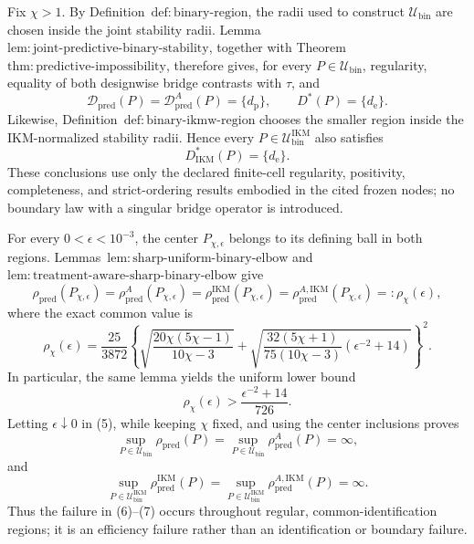 Fix \(\chi>1\). By Definition~\(\mathrm{def{:}binary\text{-}region}\), the radii used to construct \(\mathcal U_{\mathrm{bin}}\) are chosen inside the joint stability radii. Lemma~\(\mathrm{lem{:}joint\text{-}predictive\text{-}binary\text{-}stability}\), together with Theorem~\(\mathrm{thm{:}predictive\text{-}impossibility}\), therefore gives, for every \(P\in\mathcal U_{\mathrm{bin}}\), regularity, equality of both designwise bridge contrasts with \(\tau\), and
\[
 \mathcal D_{\mathrm{pred}}(P)
 =\mathcal D_{\mathrm{pred}}^A(P)=\{d_{\mathrm p}\},
 \qquad
 D^*(P)=\{d_{\mathrm e}\}. \tag{1}
\]
Likewise, Definition~\(\mathrm{def{:}binary\text{-}ikmw\text{-}region}\) chooses the smaller region inside the IKM-normalized stability radii. Hence every \(P\in\mathcal U_{\mathrm{bin}}^{\mathrm{IKM}}\) also satisfies
\[
 D_{\mathrm{IKM}}^*(P)=\{d_{\mathrm e}\}. \tag{2}
\]
These conclusions use only the declared finite-cell regularity, positivity, completeness, and strict-ordering results embodied in the cited frozen nodes; no boundary law with a singular bridge operator is introduced.

For every \(0<\epsilon<10^{-3}\), the center \(P_{\chi,\epsilon}\) belongs to its defining ball in both regions. Lemmas~\(\mathrm{lem{:}sharp\text{-}uniform\text{-}binary\text{-}elbow}\) and \(\mathrm{lem{:}treatment\text{-}aware\text{-}sharp\text{-}binary\text{-}elbow}\) give
\[
 \rho_{\mathrm{pred}}(P_{\chi,\epsilon})
 =\rho_{\mathrm{pred}}^A(P_{\chi,\epsilon})
 =\rho_{\mathrm{pred}}^{\mathrm{IKM}}(P_{\chi,\epsilon})
 =\rho_{\mathrm{pred}}^{A,\mathrm{IKM}}(P_{\chi,\epsilon})
 =:\rho_\chi(\epsilon), \tag{3}
\]
where the exact common value is
\[
 \rho_\chi(\epsilon)
 =\frac{25}{3872}
 \left\{
 \sqrt{\frac{20\chi(5\chi-1)}{10\chi-3}}
 +\sqrt{\frac{32(5\chi+1)}{75(10\chi-3)}
 \left(\epsilon^{-2}+14\right)}
 \right\}^{2}. \tag{4}
\]
In particular, the same lemma yields the uniform lower bound
\[
 \rho_\chi(\epsilon)
 >\frac{\epsilon^{-2}+14}{726}. \tag{5}
\]
Letting \(\epsilon\downarrow0\) in (5), while keeping \(\chi\) fixed, and using the center inclusions proves
\[
 \sup_{P\in\mathcal U_{\mathrm{bin}}}\rho_{\mathrm{pred}}(P)
 =\sup_{P\in\mathcal U_{\mathrm{bin}}}\rho_{\mathrm{pred}}^A(P)
 =\infty, \tag{6}
\]
and
\[
 \sup_{P\in\mathcal U_{\mathrm{bin}}^{\mathrm{IKM}}}
 \rho_{\mathrm{pred}}^{\mathrm{IKM}}(P)
 =\sup_{P\in\mathcal U_{\mathrm{bin}}^{\mathrm{IKM}}}
 \rho_{\mathrm{pred}}^{A,\mathrm{IKM}}(P)
 =\infty. \tag{7}
\]
Thus the failure in (6)--(7) occurs throughout regular, common-identification regions; it is an efficiency failure rather than an identification or boundary failure.

